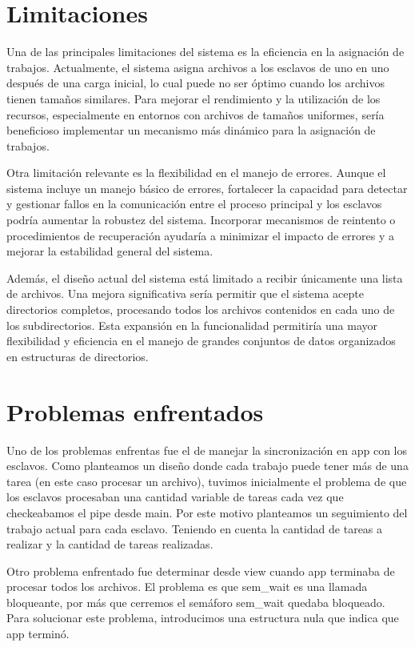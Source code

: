 \documentclass{article}
\begin{document}
\section{Limitaciones}

Una de las principales limitaciones del sistema es la eficiencia en la asignación de trabajos. Actualmente, el sistema asigna archivos a los esclavos de uno en uno después de una carga inicial, lo cual puede no ser óptimo cuando los archivos tienen tamaños similares. Para mejorar el rendimiento y la utilización de los recursos, especialmente en entornos con archivos de tamaños uniformes, sería beneficioso implementar un mecanismo más dinámico para la asignación de trabajos.

Otra limitación relevante es la flexibilidad en el manejo de errores. Aunque el sistema incluye un manejo básico de errores, fortalecer la capacidad para detectar y gestionar fallos en la comunicación entre el proceso principal y los esclavos podría aumentar la robustez del sistema. Incorporar mecanismos de reintento o procedimientos de recuperación ayudaría a minimizar el impacto de errores y a mejorar la estabilidad general del sistema.

Además, el diseño actual del sistema está limitado a recibir únicamente una lista de archivos. Una mejora significativa sería permitir que el sistema acepte directorios completos, procesando todos los archivos contenidos en cada uno de los subdirectorios. Esta expansión en la funcionalidad permitiría una mayor flexibilidad y eficiencia en el manejo de grandes conjuntos de datos organizados en estructuras de directorios.

\section{Problemas enfrentados}

Uno de los problemas enfrentas fue el de manejar la sincronización en app con los esclavos. Como planteamos un diseño donde cada trabajo puede tener más de una tarea (en este caso procesar un archivo), tuvimos inicialmente el problema de que los esclavos procesaban una cantidad variable de tareas cada vez que checkeabamos el pipe desde main. Por este motivo planteamos un seguimiento del trabajo actual para cada esclavo. Teniendo en cuenta la cantidad de tareas a realizar y la cantidad de tareas realizadas.

Otro problema enfrentado fue determinar desde view cuando app terminaba de procesar todos los archivos. El problema es que sem\_wait es una llamada bloqueante, por más que cerremos el semáforo sem\_wait quedaba bloqueado. Para solucionar este problema, introducimos una estructura nula que indica que app terminó. 
\end{document}
